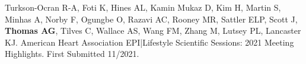 \documentclass[10pt]{article}
\renewcommand{\section}[1]{\pagebreak[3]%
    \vspace{1.3\baselineskip}%
    \phantomsection\addcontentsline{toc}{section}{#1}%
    \noindent\llap{\scshape\smash{\parbox[t]{\marginparwidth}{\hyphenpenalty=10000\raggedright #1}}}%
    \vspace{-\baselineskip}\par}
\begin{document}
\vspace{2mm}

\begin{bibenum}

\item Turkson-Ocran R-A, Foti K, Hines AL, Kamin Mukaz D, Kim H,
  Martin S, Minhas A, Norby F, Ogungbe O, Razavi AC, Rooney MR,
  Sattler ELP, Scott J, \textbf{Thomas AG}, Tilves C, Wallace AS,
  Wang FM, Zhang M, Lutsey PL, Lancaster KJ.
  American Heart Association EPI|Lifestyle Scientific Sessions: 
  2021 Meeting Highlights.
  First Submitted 11/2021.

\end{bibenum}








\end{document}
